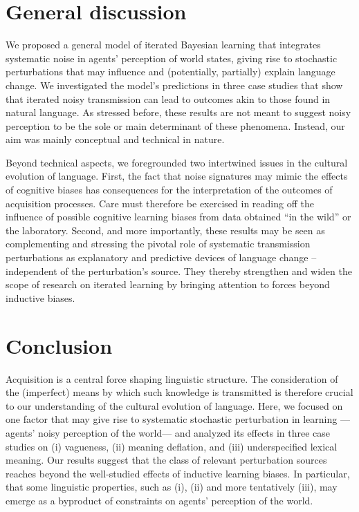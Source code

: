 \documentclass[10pt,a4paper]{article}
\begin{document}
\section{General discussion}
We proposed a general model of iterated Bayesian learning that integrates systematic noise in agents'
perception of world states, giving rise to stochastic perturbations that may influence and
(potentially, partially) explain language change. We investigated the model's predictions in
three case studies that show that iterated noisy transmission can lead to outcomes akin to
those found in natural language. As stressed before, these results are not meant to suggest
noisy perception to be the sole or main determinant of these phenomena. Instead, our aim was
mainly conceptual and technical in nature.

Beyond technical aspects, we foregrounded two intertwined issues in the cultural evolution of
language. First, the fact that noise signatures may mimic the effects of cognitive biases has
consequences for the interpretation of the outcomes of acquisition processes. Care must
therefore be exercised in reading off the influence of possible cognitive learning biases from
data obtained ``in the wild'' or the laboratory. Second, and more importantly, these results
may be seen as complementing and stressing the pivotal role of systematic transmission
perturbations as explanatory and predictive devices of language change -- independent of the
perturbation's source. They thereby strengthen and widen the scope of research on iterated
learning by bringing attention to forces beyond inductive biases.


\section{Conclusion}
Acquisition is a central force shaping linguistic structure. The consideration of the
(imperfect) means by which such knowledge is transmitted is therefore crucial to our
understanding of the cultural evolution of language. Here, we focused on one factor that may
give rise to systematic stochastic perturbation in learning ---agents' noisy perception of the
world--- and analyzed its effects in three case studies on (i) vagueness, (ii) meaning
deflation, and (iii) underspecified lexical meaning. Our results suggest that the class of
relevant perturbation sources reaches beyond the well-studied effects of inductive learning
biases. In particular, that some linguistic properties, such as (i), (ii) and more tentatively
(iii), may emerge as a byproduct of constraints on agents' perception of the world.
\end{document}
